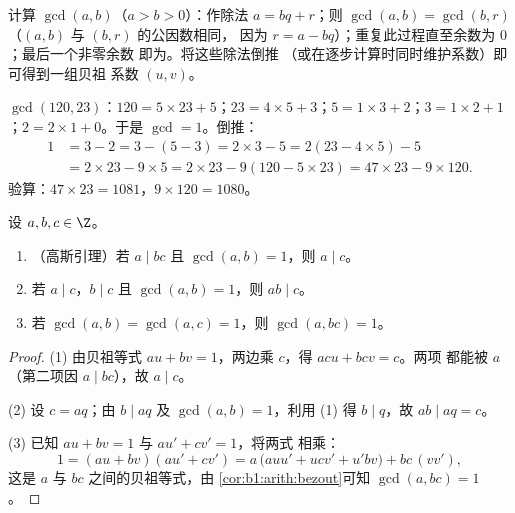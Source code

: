 \begin{method}[扩展的欧几里得算法]\label{met:b1:arith:euclid}
计算 $\gcd(a, b)$（$a > b > 0$）：作除法 $a = bq + r$；则
$\gcd(a, b) = \gcd(b, r)$（$(a,b)$ 与 $(b,r)$ 的公因数相同，
因为 $r = a - bq$）；重复此过程直至余数为 $0$；最后一个非零余数
即为。将这些除法倒推
（或在逐步计算时同时维护系数）即可得到一组贝祖
系数 $(u, v)$。
\end{method}

\begin{example}\label{ex:b1:arith:euclid}
$\gcd(120, 23)$：$120 = 5 \times 23 + 5$；$23 = 4 \times 5 + 3$；$5 =
1\times 3 + 2$；$3 = 1 \times 2 + 1$；$2 = 2 \times 1 + 0$。于是
$\gcd = 1$。倒推：
\begin{align*}
1 &= 3 - 2 = 3 - (5 - 3) = 2\times 3 - 5 = 2(23 - 4\times 5) - 5 \\
&= 2 \times 23 - 9 \times 5 = 2\times 23 - 9(120 - 5\times 23)
= 47 \times 23 - 9 \times 120 .
\end{align*}
验算：$47 \times 23 = 1081$，$9 \times 120 = 1080$。
\end{example}

\begin{theorem}[高斯引理及其推论]\label{thm:b1:arith:gauss}
设 $a, b, c \in \Z$。
\begin{enumerate}
  \item （高斯引理）若 $a \mid bc$ 且
        $\gcd(a, b) = 1$，则 $a \mid c$。
  \item 若 $a \mid c$，$b \mid c$ 且 $\gcd(a,b) = 1$，则 $ab \mid
        c$。
  \item 若 $\gcd(a, b) = \gcd(a, c) = 1$，则 $\gcd(a, bc) = 1$。
\end{enumerate}
\end{theorem}

\begin{proof}
(1) 由贝祖等式 $au + bv = 1$，两边乘 $c$，得 $acu + bcv = c$。两项
都能被 $a$ （第二项因 $a \mid bc$），故 $a
\mid c$。

(2) 设 $c = aq$；由 $b \mid aq$ 及 $\gcd(a, b) = 1$，利用 (1)
得 $b \mid q$，故 $ab \mid aq = c$。

(3) 已知 $au + bv = 1$ 与 $au' + cv' = 1$，将两式
相乘：
\[
1 = (au + bv)(au' + cv')
= a\,\bigl(auu' + ucv' + u'bv\bigr) + bc\,(vv') ,
\]
这是 $a$ 与 $bc$ 之间的贝祖等式，由
\cref{cor:b1:arith:bezout}可知 $\gcd(a, bc) = 1$。
\end{proof}

